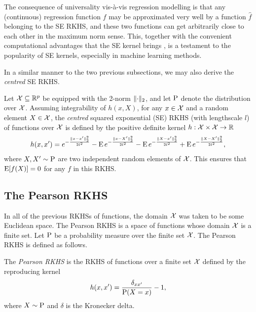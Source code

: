 The consequence of universality vis-à-vis regression modelling is that any (continuous) regression function $f$ may be approximated very well by a function $\hat f$ belonging to the SE RKHS, and these two functions can get arbitrarily close to each other in the maximum norm sense.
This, together with the convenient computational advantages that the SE kernel brings \citep{raykar2007fast}, is a testament to the  popularity of SE kernels, especially in machine learning methods.

In a similar manner to the two previous subsections, we may also derive the \emph{centred} SE RKHS. 

\begin{definition}
  Let ${\mathcal X} \subseteq \mathbb{R}^p$ be equipped with the 2-norm $\lVert\cdot\rVert_2$, and let $\operatorname{P}$ denote the distribution over ${\mathcal X}$.
  Assuming integrability of $h(x,X)$, for any $x\in{\mathcal X}$ and a random element $X\in{\mathcal X}$, the \emph{centred} squared exponential (SE) RKHS (with lengthscale $l$) of functions over ${\mathcal X}$ is defined by the positive definite kernel $h:{\mathcal X}\times{\mathcal X}\to\mathbb{R}$ 
  \[
    h(x,x') = e^{-\frac{\lVert x-x'\rVert_2^2}{2l^2}} 
    - \operatorname{E} e^{-\frac{\lVert x-X'\rVert_2^2}{2l^2}} 
    - \operatorname{E} e^{-\frac{\lVert X-x'\rVert_2^2}{2l^2}} 
    + \operatorname{E} e^{-\frac{\lVert X-X'\rVert_2^2}{2l^2}},
  \]
  where $X,X'\sim\operatorname{P}$ are two independent random elements of ${\mathcal X}$. 
  This ensures that $\operatorname{E}[ f(X) ] = 0$ for any $f$ in this RKHS.
\end{definition}

\subsection{The Pearson RKHS}

In all of the previous RKHSs of functions, the domain ${\mathcal X}$ was taken to be some Euclidean space. 
The Pearson RKHS is a space of functions whose domain ${\mathcal X}$ is a finite set.
Let $\operatorname{P}$ be a probability measure over the finite set ${\mathcal X}$. 
The Pearson RKHS is defined as follows.

\begin{definition}\label{def:pearson}
  The \emph{Pearson RKHS} is the RKHS of functions over a finite set ${\mathcal X}$ defined by the reproducing kernel
  \[
    h(x,x') = \frac{\delta_{xx'}}{\operatorname{P}(X=x)} - 1,
  \]
  where $X \sim \operatorname{P}$ and $\delta$ is the Kronecker delta.
\end{definition}

